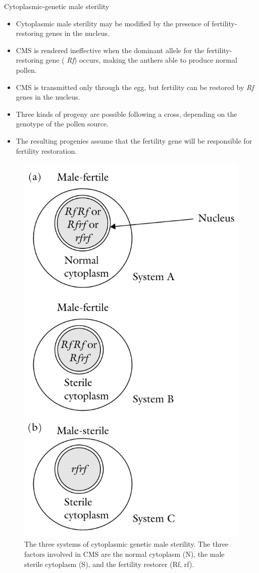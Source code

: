 \documentclass[11pt,ignorenonframetext,aspectratio=169]{beamer}
\providecommand{\tightlist}{%
  \setlength{\itemsep}{0pt}\setlength{\parskip}{0pt}}
\begin{document}
\begin{frame}{Cytoplasmic-genetic male sterility}
\protect\hypertarget{cytoplasmic-genetic-male-sterility}{}
\begin{itemize}
\tightlist
\item
  Cytoplasmic male sterility may be modified by the presence of
  fertility-restoring genes in the nucleus.
\item
  CMS is rendered ineffective when the dominant allele for the
  fertility-restoring gene ( \emph{Rf}) occurs, making the anthers able
  to produce normal pollen.
\item
  CMS is transmitted only through the egg, but fertility can be restored
  by \emph{Rf} genes in the nucleus.
\item
  Three kinds of progeny are possible following a cross, depending on
  the genotype of the pollen source.
\item
  The resulting progenies assume that the fertility gene will be
  responsible for fertility restoration.
\end{itemize}
\end{frame}

\begin{frame}{}
\protect\hypertarget{section-16}{}
\begin{figure}

{\centering \includegraphics[width=0.3\linewidth]{./images/cgms_systems} 

}

\caption{The three systems of cytoplasmic genetic male sterility. The three factors involved in CMS are the normal cytoplasm (N), the male sterile cytoplasm (S), and the fertility restorer (Rf, rf).}\label{fig:cgms-systems}
\end{figure}
\end{frame}
\end{document}
